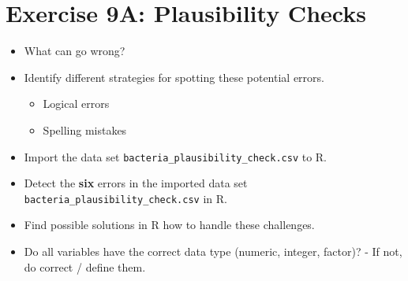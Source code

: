 \documentclass[11pt]{article}\usepackage[]{graphicx}\usepackage[]{color}
\begin{document}
\section*{Exercise 9A: Plausibility Checks}
\begin{itemize}
\item What can go wrong?
\item Identify different strategies for spotting these potential errors.
\begin{itemize}
\item Logical errors
\item Spelling mistakes
\end{itemize}
\item Import the data set \texttt{bacteria\_plausibility\_check.csv} to R.

\item Detect the \textbf{six} errors in the imported data set
\texttt{bacteria\_plausibility\_check.csv} in R.

\item Find possible solutions in R how to handle these challenges.

\item Do all variables have the correct data type (numeric, integer, factor)?
- If not, do correct / define them.

\end{itemize}
%
\end{document}
